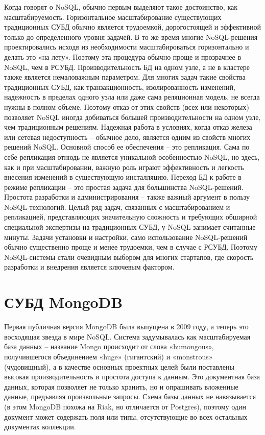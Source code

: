 \documentclass[14pt]{extreport}
\begin{document}
Когда говорят о NoSQL, обычно первым выделяют такое достоинство, как масштабируемость. Горизонтальное масштабирование существующих традиционных СУБД обычно является трудоемкой, дорогостоящей и эффективной только до определенного уровня задачей. В то же время многие NoSQL-решения проектировались исходя из необходимости масштабироваться горизонтально и делать это «на лету». Поэтому эта процедура обычно проще и прозрачнее в NoSQL, чем в РСУБД. Производительность БД на одном узле, а не в кластере также является немаловажным параметром. Для многих задач такие свойства традиционных СУБД, как транзакционность, изолированность изменений, надежность в пределах одного узла или даже сама реляционная модель, не всегда нужны в полном объеме. Поэтому отказ от этих свойств (всех или некоторых) позволяет NoSQL иногда добиваться большей производительности на одном узле, чем традиционным решениям. Надежная работа в условиях, когда отказ железа или сетевая недоступность – обычное дело, является одним из свойств многих решений NoSQL. Основной способ ее обеспечения – это репликация. Сама по себе репликация отнюдь не является уникальной особенностью NoSQL, но здесь, как и при масштабировании, важную роль играют эффективность и легкость внесения изменений в существующую инсталляцию. Переход БД к работе в режиме репликации – это простая задача для большинства NoSQL-решений. Простота разработки и администрирования – также важный аргумент в пользу NoSQL-технологий.
Целый ряд задач, связанных с масштабированием и репликацией, представляющих значительную сложность и требующих обширной специальной экспертизы на традиционных СУБД, у NoSQL занимает считанные минуты. Задачи установки и настройки, само использование NoSQL-решений обычно существенно проще и менее трудоемки, чем в случае с РСУБД. Поэтому NoSQL-системы стали очевидным выбором для многих стартапов, где скорость разработки и внедрения является ключевым фактором.

\section{СУБД MongoDB}
Первая публичная версия MongoDB была выпущена в 2009 году, а теперь это восходящая звезда в мире NoSQL. Система задумывалась как масштабируемая база данных – название Mongo происходит от слова «humongous», получившегося объединением «huge» (гигантский) и «monstrous» (чудовищный), а в качестве основных проектных целей были поставлены высокая производительность и простота доступа к данным. Это документная база данных, которая позволяет не только хранить, но и опрашивать вложенные данные, предъявляя произвольные запросы. Схема базы данных не навязывается (в этом MongoDB похожа на Riak, но отличается от Postgres), поэтому один
документ может содержать поля или типы, отсутствующие во всех остальных документах коллекции.
\end{document}
